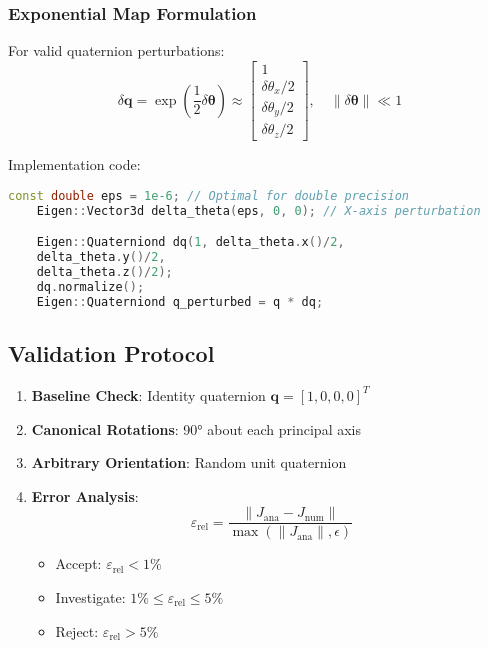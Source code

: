 \documentclass{article}
\begin{document}
\subsubsection{Exponential Map Formulation}
For valid quaternion perturbations:
\begin{equation}
	\delta\mathbf{q} = \exp\left(\frac{1}{2}\delta\boldsymbol{\theta}\right) \approx \begin{bmatrix}
		1 \\
		\delta\theta_x/2 \\
		\delta\theta_y/2 \\
		\delta\theta_z/2
	\end{bmatrix}, \quad \|\delta\boldsymbol{\theta}\| \ll 1
\end{equation}

Implementation code:
\begin{lstlisting}[language=C++,basicstyle=\color{codeblue}\ttfamily]
	const double eps = 1e-6; // Optimal for double precision
	Eigen::Vector3d delta_theta(eps, 0, 0); // X-axis perturbation

	Eigen::Quaterniond dq(1, delta_theta.x()/2,
	delta_theta.y()/2,
	delta_theta.z()/2);
	dq.normalize();
	Eigen::Quaterniond q_perturbed = q * dq;
\end{lstlisting}

\subsection{Validation Protocol}
\label{subsec:protocol}

\begin{enumerate}
	\item \textbf{Baseline Check}: Identity quaternion $\mathbf{q}=[1,0,0,0]^T$
	\item \textbf{Canonical Rotations}: 90° about each principal axis
	\item \textbf{Arbitrary Orientation}: Random unit quaternion
	\item \textbf{Error Analysis}:
	\begin{equation}
		\varepsilon_{\text{rel}} = \frac{\|J_{\text{ana}} - J_{\text{num}}\|}{\max(\|J_{\text{ana}}\|, \epsilon)}
	\end{equation}
	\begin{itemize}
		\item Accept: $\varepsilon_{\text{rel}} < 1\%$
		\item Investigate: $1\% \leq \varepsilon_{\text{rel}} \leq 5\%$
		\item Reject: $\varepsilon_{\text{rel}} > 5\%$
	\end{itemize}
\end{enumerate}
\end{document}
